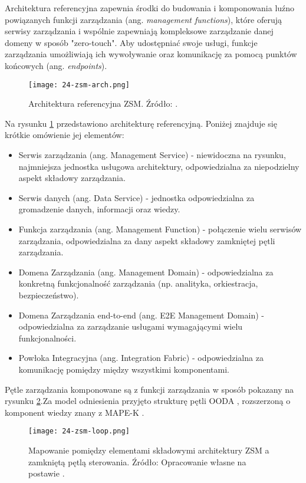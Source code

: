 Architektura referencyjna zapewnia środki do budowania i komponowania luźno powiązanych funkcji zarządzania (ang. \textit{management functions}), które oferują serwisy zarządzania i wspólnie zapewniają kompleksowe zarządzanie danej domeny w sposób "zero-touch". Aby udostępniać swoje usługi, funkcje zarządzania umożliwiają ich wywoływanie oraz komunikację za pomocą punktów końcowych (ang. \textit{endpoints}).

\begin{figure}[!htbp]
    \centering \texttt{[image: 24-zsm-arch.png]}
    \caption{Architektura referencyjna ZSM. Źródło: \cite{etsizsm2018}.}\label{fig:24-zsm-arch}
\end{figure}

Na rysunku \ref{fig:24-zsm-arch} przedstawiono architekturę referencyjną. Poniżej znajduje się krótkie omówienie jej elementów:
\begin{itemize}
    \item Serwis zarządzania (ang. Management Service) - niewidoczna na rysunku, najmniejsza jednostka usługowa architektury, odpowiedzialna za niepodzielny aspekt składowy zarządzania.
    \item Serwis danych (ang. Data Service) - jednostka odpowiedzialna za gromadzenie danych, informacji oraz wiedzy.
    \item Funkcja zarządzania (ang. Management Function) - połączenie wielu serwisów zarządzania, odpowiedzialna za dany aspekt składowy zamkniętej pętli zarządzania.
    \item Domena Zarządzania (ang. Management Domain) - odpowiedzialna za konkretną funkcjonalność zarządzania (np. analityka, orkiestracja, bezpieczeństwo).
    \item Domena Zarządzania end-to-end (ang. E2E Management Domain) - odpowiedzialna za zarządzanie usługami wymagającymi wielu funkcjonalności.
    \item Powłoka Integracyjna (ang. Integration Fabric) - odpowiedzialna za komunikację pomiędzy między wszystkimi komponentami.
\end{itemize}

Pętle zarządzania komponowane są z funkcji zarządzania w sposób pokazany na rysunku \ref{fig:24-zsm-loop}.Za model odniesienia przyjęto strukturę pętli OODA \cite{boyd1995}, rozszerzoną o komponent wiedzy znany z MAPE-K \cite{kephart2003}.

\begin{figure}[!htbp]
    \centering \texttt{[image: 24-zsm-loop.png]}
    \caption{Mapowanie pomiędzy elementami składowymi architektury ZSM a zamkniętą pętlą sterowania. Źródło: Opracowanie własne na postawie \cite{etsizsm2019}.}\label{fig:24-zsm-loop}
\end{figure}


